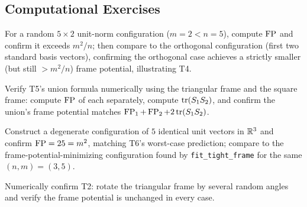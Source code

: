 \subsection*{Computational Exercises}
\begin{compexercises}
	\item For a random $5\times2$ unit-norm configuration ($m=2<n=5$),
	compute $\operatorname{FP}$ and confirm it exceeds $m^2/n$; then compare to the
	orthogonal configuration (first two standard basis vectors),
	confirming the orthogonal case achieves a strictly smaller (but
	still $>m^2/n$) frame potential, illustrating T4.
	
	\item Verify T5's union formula numerically using the triangular frame
	and the square frame: compute $\operatorname{FP}$ of each separately, compute
	$\operatorname{tr}(S_1S_2)$, and confirm the union's frame potential matches
	$\operatorname{FP}_1+\operatorname{FP}_2+2\operatorname{tr}(S_1S_2)$.
	
	\item Construct a degenerate configuration of $5$ identical unit
	vectors in $\mathbb{R}^3$ and confirm $\operatorname{FP}=25=m^2$, matching T6's
	worst-case prediction; compare to the frame-potential-minimizing
	configuration found by \texttt{fit\_tight\_frame} for the same
	$(n,m)=(3,5)$.
	
	\item Numerically confirm T2: rotate the triangular frame by several
	random angles and verify the frame potential is unchanged in
	every case.
\end{compexercises}